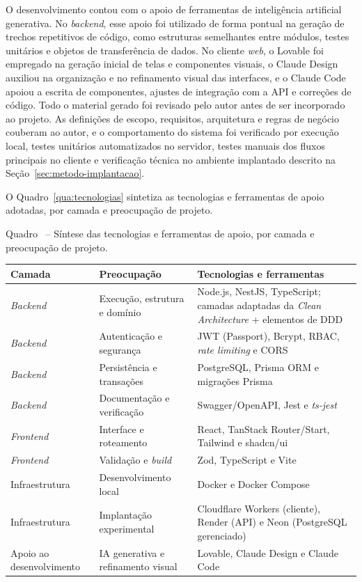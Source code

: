 \documentclass[a4paper,12pt]{article}
\renewenvironment{quadroCustom}[3][!htbp]{%
  \refstepcounter{quadro}
  \label{#3}%
  \begin{table}[#1]
    \centering
    {Quadro \thequadro~-- #2\par}%
    \medskip
}{%
  \end{table}
  \FloatBarrier
}
\begin{document}
O desenvolvimento contou com o apoio de ferramentas de inteligência artificial generativa. No \textit{backend}, esse apoio foi utilizado de forma pontual na geração de trechos repetitivos de código, como estruturas semelhantes entre módulos, testes unitários e objetos de transferência de dados. No cliente \textit{web}, o Lovable foi empregado na geração inicial de telas e componentes visuais, o Claude Design auxiliou na organização e no refinamento visual das interfaces, e o Claude Code apoiou a escrita de componentes, ajustes de integração com a API e correções de código. Todo o material gerado foi revisado pelo autor antes de ser incorporado ao projeto. As definições de escopo, requisitos, arquitetura e regras de negócio couberam ao autor, e o comportamento do sistema foi verificado por execução local, testes unitários automatizados no servidor, testes manuais dos fluxos principais no cliente e verificação técnica no ambiente implantado descrito na Seção~\ref{sec:metodo-implantacao}.

O Quadro~\ref{qua:tecnologias} sintetiza as tecnologias e ferramentas de apoio adotadas, por camada e preocupação de projeto.

\begin{quadroCustom}{Síntese das tecnologias e ferramentas de apoio, por camada e preocupação de projeto.}{qua:tecnologias}
{\footnotesize
\begin{tabularx}{\textwidth}{|>{\raggedright\arraybackslash}p{2.75cm}|>{\raggedright\arraybackslash}p{3.25cm}|X|}
\hline
\textbf{Camada} & \textbf{Preocupação} & \textbf{Tecnologias e ferramentas} \\ \hline
\textit{Backend} & Execução, estrutura e domínio & Node.js, NestJS, TypeScript; camadas adaptadas da \textit{Clean Architecture} + elementos de DDD \\ \hline
\textit{Backend} & Autenticação e segurança & JWT (Passport), Bcrypt, RBAC, \textit{rate limiting} e CORS \\ \hline
\textit{Backend} & Persistência e transações & PostgreSQL, Prisma ORM e migrações Prisma \\ \hline
\textit{Backend} & Documentação e verificação & Swagger/OpenAPI, Jest e \textit{ts-jest} \\ \hline
\textit{Frontend} & Interface e roteamento & React, TanStack Router/Start, Tailwind e shadcn/ui \\ \hline
\textit{Frontend} & Validação e \textit{build} & Zod, TypeScript e Vite \\ \hline
Infraestrutura & Desenvolvimento local & Docker e Docker Compose \\ \hline
Infraestrutura & Implantação experimental & Cloudflare Workers (cliente), Render (API) e Neon (PostgreSQL gerenciado) \\ \hline
Apoio ao desenvolvimento & IA generativa e refinamento visual & Lovable, Claude Design e Claude Code \\ \hline
\end{tabularx}
}
\end{quadroCustom}
\end{document}

